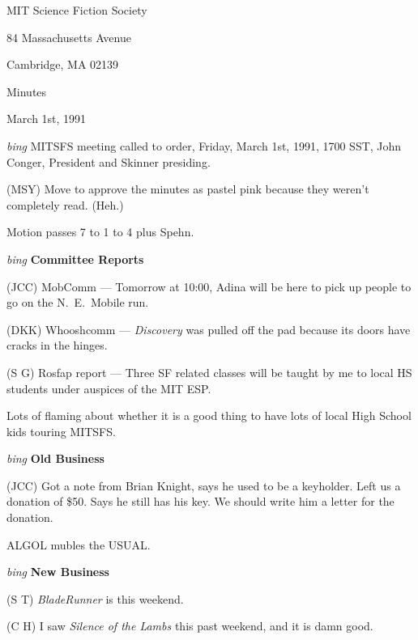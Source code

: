 \setlength{\topmargin}{-0.5in}
\setlength{\oddsidemargin}{0.0in}
\setlength{\evensidemargin}{0.0in}
\setlength{\textheight}{9in}
\setlength{\textwidth}{6.5in}



\begin{center}
MIT Science Fiction Society

84 Massachusetts Avenue

Cambridge, MA 02139

\vspace{0.2in}
Minutes

March 1st, 1991

\end{center}

\vspace{0.15in}
{\em bing\/}  MITSFS meeting called to order, Friday, March 1st, 1991,
1700 SST, John Conger, President and Skinner presiding.

(MSY) Move to approve the minutes as pastel pink because they weren't
completely read.  (Heh.)

Motion passes 7 to 1 to 4 plus Spehn.

\vspace{0.15in}
{\em bing\/} {\bf Committee Reports\/}

(JCC) MobComm --- Tomorrow at 10:00, Adina will be here to pick up people to
go on the N.~E.~Mobile run.

(DKK) Whooshcomm --- {\em Discovery\/} was pulled off the pad because its doors
have cracks in the hinges.

(S G) Rosfap report --- Three SF related classes will be taught by me to
local HS students under auspices of the MIT ESP.

Lots of flaming about whether it is a good thing to have lots of local
High School kids touring {\sc MITSFS}.

\vspace{.15in}
{\em bing\/} {\bf Old Business\/}

(JCC) Got a note from Brian Knight, says he used to be a keyholder.  Left us
a donation of \$50.  Says he still has his key.  We should write him a letter
for the donation.

ALGOL mubles the USUAL.

\vspace{0.15in}
{\em bing\/} {\bf New Business\/}

(S T) {\em BladeRunner\/} is this weekend.

(C H) I saw {\em Silence of the Lambs\/} this past weekend, and it is damn
good.

